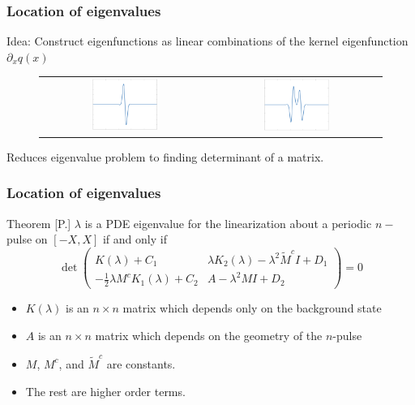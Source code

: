 \documentclass[16pt]{beamer}
\begin{document}
\begin{frame}
	\frametitle{Location of eigenvalues}
	\fontsize{16}{7.2}\selectfont
	Idea: Construct eigenfunctions as linear combinations of the kernel eigenfunction $\partial_x q(x)$
	\begin{figure}
	\begin{center}
	\begin{tabular}{cc}
	\includegraphics[width=0.4\textwidth]{images/kerneleig} & 
	\includegraphics[width=0.4\textwidth]{images/DP1eig} \\
	\end{tabular}
	\end{center}
	\end{figure}
	Reduces eigenvalue problem to finding determinant of a matrix.
\end{frame}

\begin{frame}
\frametitle{Location of eigenvalues} 
	\fontsize{14}{7.2}\selectfont
    \begin{block}{Theorem [P.]}
    $\lambda$ is a PDE eigenvalue for the linearization about a periodic $n-$pulse on $[-X, X]$ if and only if 
    \[
    \det\begin{pmatrix}
K(\lambda) + C_1 & \lambda K_2(\lambda) - \lambda^2 \tilde{M}^c I + D_1 \\
-\frac{1}{2} \lambda M^c K_1(\lambda) + C_2 & A - \lambda^2 MI + D_2
\end{pmatrix} = 0
    \]
    \begin{itemize}
    	\item $K(\lambda)$ is an $n \times n$ matrix which depends only on the background state
    	\item $A$ is an $n \times n$ matrix which depends on the geometry of the $n$-pulse
    	\item $M$, $M^c$, and $\tilde{M}^c$ are constants.
    	\item The rest are higher order terms.
    \end{itemize}
    \end{block}
\end{frame}
\end{document}
